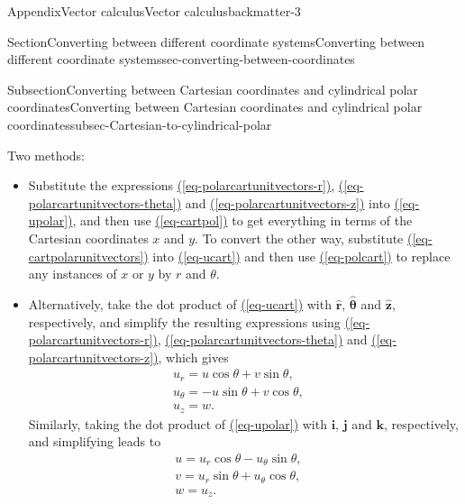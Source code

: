 \documentclass[oneside,10pt,]{book}
\newcommand{\xreffont}{\relax}
\newcommand{\ptxlistdisc}{\raisebox{0.3ex}{\textbullet}}
\newcommand{\ptxlistcircle}{\raisebox{0.3ex}{\textopenbullet}}
\numberwithin{equation}{section}
\begin{document}
\begin{appendixptx}{Appendix}{Vector calculus}{}{Vector calculus}{}{}{backmatter-3}
\begin{sectionptx}{Section}{Converting between different coordinate systems}{}{Converting between different coordinate systems}{}{}{sec-converting-between-coordinates}
\begin{subsectionptx}{Subsection}{Converting between Cartesian coordinates and cylindrical polar coordinates}{}{Converting between Cartesian coordinates and cylindrical polar coordinates}{}{}{subsec-Cartesian-to-cylindrical-polar}
\begin{itemize}[label=\ptxlistdisc]
\begin{equation}
\end{equation}
Two methods:%
\begin{itemize}[label=\ptxlistcircle]
\item{}Substitute the expressions \hyperref[eq-polarcartunitvectors-r]{({\xreffont\ref{eq-polarcartunitvectors-r}})}, \hyperref[eq-polarcartunitvectors-theta]{({\xreffont\ref{eq-polarcartunitvectors-theta}})} and \hyperref[eq-polarcartunitvectors-z]{({\xreffont\ref{eq-polarcartunitvectors-z}})} into \hyperref[eq-upolar]{({\xreffont\ref{eq-upolar}})}, and then use \hyperref[eq-cartpol]{({\xreffont\ref{eq-cartpol}})} to get everything in terms of the Cartesian coordinates \(x\) and \(y\). To convert the other way, substitute \hyperref[eq-cartpolarunitvectors]{({\xreffont\ref{eq-cartpolarunitvectors}})} into \hyperref[eq-ucart]{({\xreffont\ref{eq-ucart}})} and then use \hyperref[eq-polcart]{({\xreffont\ref{eq-polcart}})} to replace any instances of \(x\) or \(y\) by \(r\) and \(\theta\).%
\item{}Alternatively, take the dot product of \hyperref[eq-ucart]{({\xreffont\ref{eq-ucart}})} with \(\hat{\boldsymbol{r}}\), \(\hat{\boldsymbol{\theta}}\) and \(\hat{\boldsymbol{z}}\), respectively, and simplify the resulting expressions using \hyperref[eq-polarcartunitvectors-r]{({\xreffont\ref{eq-polarcartunitvectors-r}})}, \hyperref[eq-polarcartunitvectors-theta]{({\xreffont\ref{eq-polarcartunitvectors-theta}})} and \hyperref[eq-polarcartunitvectors-z]{({\xreffont\ref{eq-polarcartunitvectors-z}})}, which gives%
\begin{gather}
u_r=u\cos\theta+v\sin\theta,\label{eq-cartcyl-r}\\
u_\theta=-u\sin\theta+v\cos\theta,\quad\label{eq-cartcyl-theta}\\
u_z=w.\label{eq-cartcyl-z}
\end{gather}
Similarly, taking the dot product of \hyperref[eq-upolar]{({\xreffont\ref{eq-upolar}})} with \(\boldsymbol{i}\), \(\boldsymbol{j}\) and \(\boldsymbol{k}\), respectively, and simplifying leads to%
\begin{gather}
u=u_r\cos\theta-u_\theta\sin\theta,\quad\label{eq-cylcart-r}\\
v=u_r\sin\theta+u_\theta\cos\theta,\quad\label{eq-cylcart-theta}\\
w=u_z.\label{eq-cylcart-z}
\end{gather}
%
\end{itemize}
%
\end{itemize}
%
\par

\end{subsectionptx}
\end{sectionptx}
\end{appendixptx}
\end{document}
